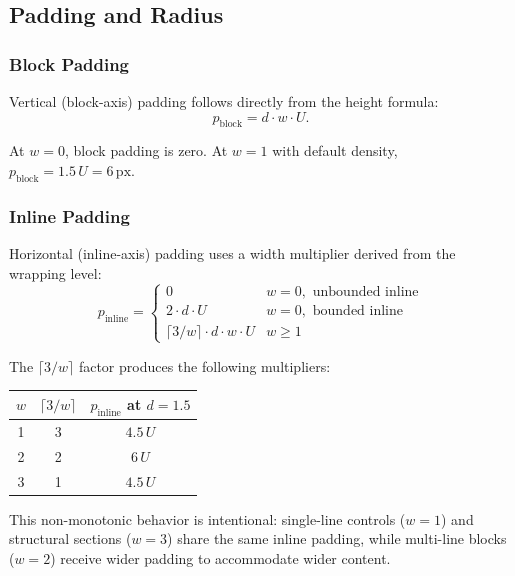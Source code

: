 \subsection{Padding and Radius}
\label{sec:padding}

\subsubsection{Block Padding}

Vertical (block-axis) padding follows directly from the height formula:
\begin{equation}
p_{\text{block}} = d \cdot w \cdot U.
\end{equation}

At $w = 0$, block padding is zero. At $w = 1$ with default density, $p_{\text{block}} = 1.5\,U = 6\,\text{px}$.

\subsubsection{Inline Padding}

Horizontal (inline-axis) padding uses a width multiplier derived from the wrapping level:
\begin{equation}
p_{\text{inline}} =
\begin{cases}
0 & w = 0, \text{ unbounded inline} \\
2 \cdot d \cdot U & w = 0, \text{ bounded inline} \\
\lceil 3 / w \rceil \cdot d \cdot w \cdot U & w \ge 1
\end{cases}
\end{equation}

The $\lceil 3 / w \rceil$ factor produces the following multipliers:

\begin{center}
\begin{tabular}{ccc}
\toprule
$w$ & $\lceil 3/w \rceil$ & $p_{\text{inline}}$ at $d = 1.5$ \\
\midrule
1 & 3 & $4.5\,U$ \\
2 & 2 & $6\,U$ \\
3 & 1 & $4.5\,U$ \\
\bottomrule
\end{tabular}
\end{center}

This non-monotonic behavior is intentional: single-line controls ($w = 1$) and structural sections ($w = 3$) share the same inline padding, while multi-line blocks ($w = 2$) receive wider padding to accommodate wider content.

